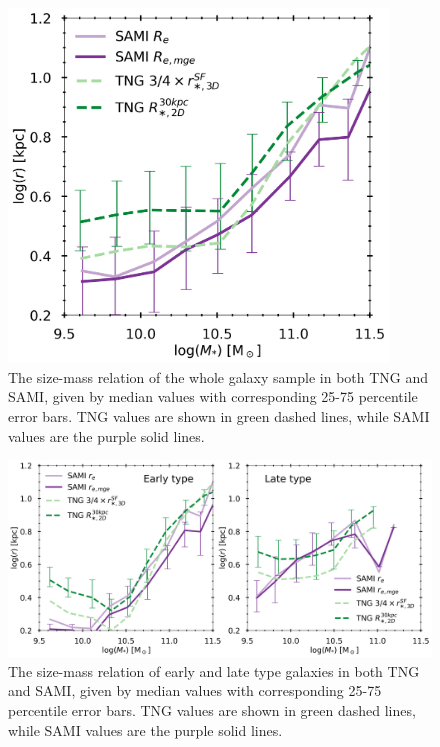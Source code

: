\begin{figure}
    \centering
    \includegraphics[width=0.9\textwidth]{images/SM_R.png}
    \caption{The size-mass relation of the whole galaxy sample in both TNG and SAMI, given by median values with corresponding 25-75 percentile error bars. TNG values are shown in green dashed lines, while SAMI values are the purple solid lines.}
    \label{SM_R}
\end{figure}

\begin{figure}
    \centering
    \includegraphics[width=\textwidth]{images/SM_R_morph.png}
    \caption{The size-mass relation of early and late type galaxies in both TNG and SAMI, given by median values with corresponding 25-75 percentile error bars. TNG values are shown in green dashed lines, while SAMI values are the purple solid lines.}
    \label{SM_R_morph}
\end{figure}

